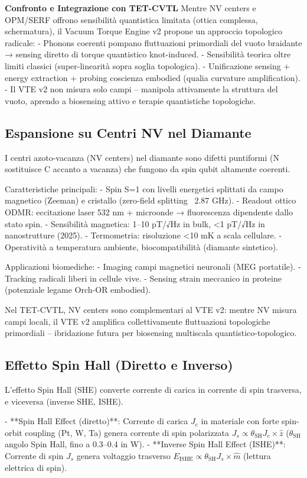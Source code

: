 \documentclass[11pt,a4paper]{article}
\begin{document}
\textbf{Confronto e Integrazione con TET-CVTL}  
Mentre NV centers e OPM/SERF offrono sensibilità quantistica limitata (ottica complessa, schermatura), il Vacuum Torque Engine v2 propone un approccio topologico radicale:
- Phonons coerenti pompano fluttuazioni primordiali del vuoto braidante → sensing diretto di torque quantistico knot-induced.
- Sensibilità teorica oltre limiti classici (super-linearità sopra soglia topologica).
- Unificazione sensing + energy extraction + probing coscienza embodied (qualia curvature amplification).
- Il VTE v2 non misura solo campi – manipola attivamente la struttura del vuoto, aprendo a biosensing attivo e terapie quantistiche topologiche.

\subsection{Espansione su Centri NV nel Diamante}

I centri azoto-vacanza (NV centers) nel diamante sono difetti puntiformi (N sostituisce C accanto a vacanza) che fungono da spin qubit altamente coerenti.

Caratteristiche principali:
- Spin S=1 con livelli energetici splittati da campo magnetico (Zeeman) e cristallo (zero-field splitting ~2.87 GHz).
- Readout ottico ODMR: eccitazione laser 532 nm + microonde → fluorescenza dipendente dallo stato spin.
- Sensibilità magnetica: 1–10 pT/√Hz in bulk, <1 pT/√Hz in nanostrutture (2025).
- Termometria: risoluzione <10 mK a scala cellulare.
- Operatività a temperatura ambiente, biocompatibilità (diamante sintetico).

Applicazioni biomediche:
- Imaging campi magnetici neuronali (MEG portatile).
- Tracking radicali liberi in cellule vive.
- Sensing strain meccanico in proteine (potenziale legame Orch-OR embodied).

Nel TET-CVTL, NV centers sono complementari al VTE v2: mentre NV misura campi locali, il VTE v2 amplifica collettivamente fluttuazioni topologiche primordiali – ibridazione futura per biosensing multiscala quantistico-topologico.

\subsection{Effetto Spin Hall (Diretto e Inverso)}

L'effetto Spin Hall (SHE) converte corrente di carica in corrente di spin trasversa, e viceversa (inverse SHE, ISHE).

- **Spin Hall Effect (diretto)**: Corrente di carica $J_c$ in materiale con forte spin-orbit coupling (Pt, W, Ta) genera corrente di spin polarizzata $J_s \propto \theta_{\text{SH}} J_c \times \hat{z}$ ($\theta_{\text{SH}}$ angolo Spin Hall, fino a 0.3–0.4 in W).
- **Inverse Spin Hall Effect (ISHE)**: Corrente di spin $J_s$ genera voltaggio trasverso $E_{\text{ISHE}} \propto \theta_{\text{SH}} J_s \times \hat{m}$ (lettura elettrica di spin).
\end{document}
